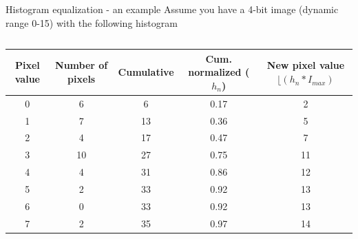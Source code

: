 \documentclass[9pt, aspectratio=169]{beamer}
\begin{document}
\begin{frame}
    {Histogram equalization - an example}
    \centering
    Assume you have a 4-bit image (dynamic range 0-15) with the following histogram

    \vspace{1em}

    \begin{columns}
        \begin{column}{.7\textwidth}
            \tiny{
                \begin{tabular}{ccc<{\onslide<2->}c<{\onslide<3->}c<{\onslide}}
                    \hline
                    \textbf{Pixel value} & \textbf{Number of pixels} & \textbf{Cumulative} & \textbf{Cum. normalized} ($h_n$) & \textbf{New pixel value} $\lfloor{(h_n*I_{max})}$ \\
                    \hline
                    0                    & 6                         & 6                   & 0.17                             & 2                                                 \\
                    1                    & 7                         & 13                  & 0.36                             & 5                                                 \\
                    2                    & 4                         & 17                  & 0.47                             & 7                                                 \\
                    3                    & 10                        & 27                  & 0.75                             & 11                                                \\
                    4                    & 4                         & 31                  & 0.86                             & 12                                                \\
                    5                    & 2                         & 33                  & 0.92                             & 13                                                \\
                    6                    & 0                         & 33                  & 0.92                             & 13                                                \\
                    7                    & 2                         & 35                  & 0.97                             & 14                                                \\

\end{tabular}}
\end{column}
\end{columns}
\end{frame}
\end{document}
